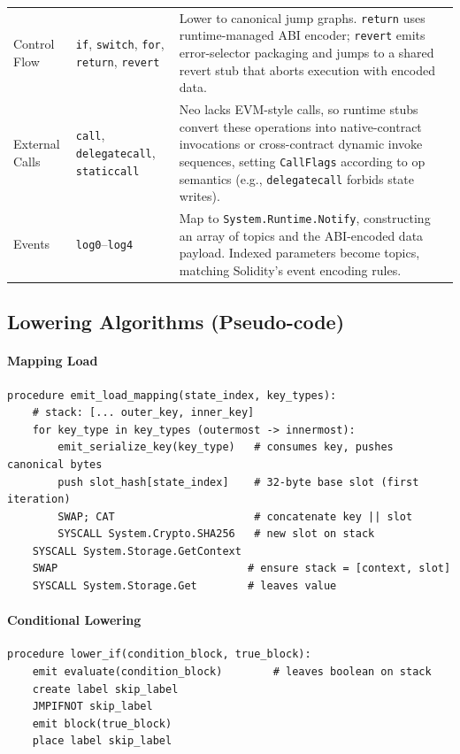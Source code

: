 \documentclass[11pt]{article}
\begin{document}
\begin{table}[H]
\begin{tabularx}{\textwidth}{@{}p{}p{}X@{}}
Control Flow & \texttt{if}, \texttt{switch}, \texttt{for}, \texttt{return}, \texttt{revert} & Lower to canonical jump graphs. \texttt{return} uses runtime-managed ABI encoder; \texttt{revert} emits error-selector packaging and jumps to a shared revert stub that aborts execution with encoded data.\\
External Calls & \texttt{call}, \texttt{delegatecall}, \texttt{staticcall} & Neo lacks EVM-style calls, so runtime stubs convert these operations into native-contract invocations or cross-contract dynamic invoke sequences, setting \texttt{CallFlags} according to op semantics (e.g., \texttt{delegatecall} forbids state writes).\\
Events & \texttt{log0}--\texttt{log4} & Map to \texttt{System.Runtime.Notify}, constructing an array of topics and the ABI-encoded data payload. Indexed parameters become topics, matching Solidity's event encoding rules.\\
\bottomrule
\end{tabularx}
\end{table}

\subsection{Lowering Algorithms (Pseudo-code)}
\paragraph{Mapping Load}
\begin{verbatim}
procedure emit_load_mapping(state_index, key_types):
    # stack: [... outer_key, inner_key]
    for key_type in key_types (outermost -> innermost):
        emit_serialize_key(key_type)   # consumes key, pushes canonical bytes
        push slot_hash[state_index]    # 32-byte base slot (first iteration)
        SWAP; CAT                      # concatenate key || slot
        SYSCALL System.Crypto.SHA256   # new slot on stack
    SYSCALL System.Storage.GetContext
    SWAP                              # ensure stack = [context, slot]
    SYSCALL System.Storage.Get        # leaves value
\end{verbatim}

\paragraph{Conditional Lowering}
\begin{verbatim}
procedure lower_if(condition_block, true_block):
    emit evaluate(condition_block)        # leaves boolean on stack
    create label skip_label
    JMPIFNOT skip_label
    emit block(true_block)
    place label skip_label
\end{verbatim}
\end{document}
